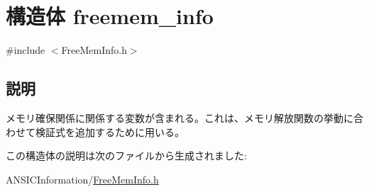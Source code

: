 \hypertarget{structfreemem__info}{
\section{構造体 freemem\_\-info}
\label{structfreemem__info}
}


{\ttfamily \#include $<$FreeMemInfo.h$>$}



\subsection{説明}
メモリ確保関係に関係する変数が含まれる。これは、メモリ解放関数の挙動に合わせて検証式を追加するために用いる。 

この構造体の説明は次のファイルから生成されました:\begin{DoxyCompactItemize}
\item 
ANSICInformation/\hyperlink{FreeMemInfo_8h}{FreeMemInfo.h}\end{DoxyCompactItemize}

